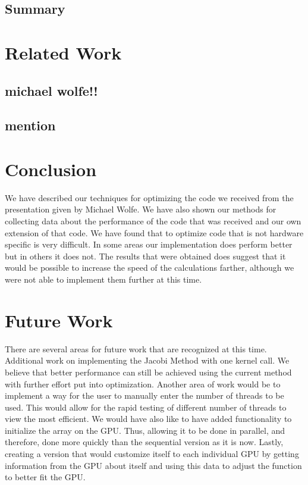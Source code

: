\documentclass[10pt]{article}
\begin{document}
\begin{multicols}{2}
  \subsection{Summary} %

  \section{Related Work} %
  \subsection{michael wolfe!!}
  \subsection{mention} %

  \section{Conclusion} %
  We have described our techniques for optimizing the code we received from the presentation given by Michael Wolfe.
  We have also shown our methods for collecting data about the performance of the code that was received and our own extension of that code.
  We have found that to optimize code that is not hardware specific is very difficult.
  In some areas our implementation does perform better but in others it does not.
  The results that were obtained does suggest that it would be possible to increase the speed of the calculations farther, although we were not able to implement them further at this time.

  \section{Future Work} %
  There are several areas for future work that are recognized at this time.
  Additional work on implementing the Jacobi Method with one kernel call.
  We believe that better performance can still be achieved using the current method with further effort put into optimization.
  Another area of work would be to implement a way for the user to manually enter the number of threads to be used.
  This would allow for the rapid testing of different number of threads to view the most efficient.
  We would have also like to have added functionality to initialize the array on the GPU.
  Thus, allowing it to be done in parallel, and therefore, done more quickly than the sequential version as it is now.
  Lastly, creating a version that would customize itself to each individual GPU by getting information from the GPU about itself and using this data to adjust the function to better fit the GPU.


\end{multicols}
\end{document}
